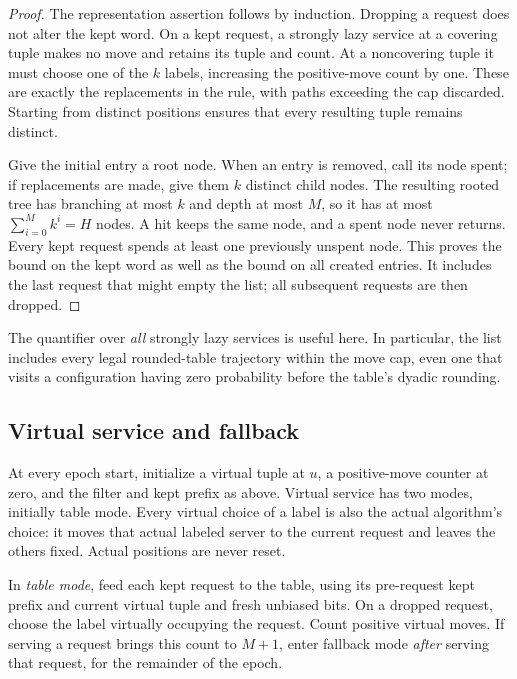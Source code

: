 \begin{proof}
The representation assertion follows by induction.  Dropping a request
does not alter the kept word.  On a kept request, a strongly lazy service
at a covering tuple makes no move and retains its tuple and count.  At a
noncovering tuple it must choose one of the $k$ labels, increasing the
positive-move count by one.  These are exactly the replacements in the
rule, with paths exceeding the cap discarded.  Starting from distinct
positions ensures that every resulting tuple remains distinct.

Give the initial entry a root node.  When an entry is removed, call its
node spent; if replacements are made, give them $k$ distinct child nodes.
The resulting rooted tree has branching at most $k$ and depth at most
$M$, so it has at most $\sum_{i=0}^{M}k^i=H$ nodes.  A hit keeps the same
node, and a spent node never returns.  Every kept request spends at least
one previously unspent node.  This proves the bound on the kept word as
well as the bound on all created entries.  It includes the last request
that might empty the list; all subsequent requests are then dropped.
\end{proof}

The quantifier over \emph{all} strongly lazy services is useful here.
In particular, the list includes every legal rounded-table trajectory
within the move cap, even one that visits a configuration having zero
probability before the table's dyadic rounding.

\subsection{Virtual service and fallback}

At every epoch start, initialize a virtual tuple at $u$, a positive-move
counter at zero, and the filter and kept prefix as above.  Virtual service
has two modes, initially table mode.  Every virtual choice of a label is
also the actual algorithm's choice: it moves that actual labeled server
to the current request and leaves the others fixed.  Actual positions
are never reset.

In \emph{table mode}, feed each kept request to the table, using its
pre-request kept prefix and current virtual tuple and fresh unbiased
bits.  On a dropped request, choose the label virtually occupying the
request.  Count positive virtual moves.  If serving a request brings
this count to $M+1$, enter fallback mode \emph{after} serving that
request, for the remainder of the epoch.

